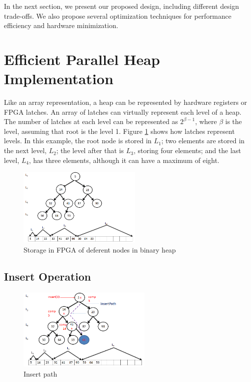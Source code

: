 \documentclass[10pt, conference, compsocconf]{IEEEtran}
\begin{document}
In the next section, we present our proposed design, including different design trade-offs. We also propose several optimization techniques for performance efficiency and hardware minimization.

\section{Efficient Parallel Heap Implementation}
Like an array representation, a heap can be represented by hardware registers or FPGA latches.
An array of latches can virtually represent each level of a heap.
The number of latches at each level can be represented as $2^{\beta-1}$, where $\beta$ is the level, assuming that root is the level 1.
Figure \ref{fig5} shows how latches represent levels.
In this example, the root node is stored in $L_1$; two elements are stored in the next level, $L_2$; the level after that is $L_3$, storing four elements; and the last level, $L_4$, has three elements, although it can have a maximum of eight.

\begin{figure}[!ht]
  \centering
  \includegraphics[width=6cm]{Figures/5.png}
      \caption{Storage in FPGA of deferent nodes in binary heap}
    \label{fig5}
\end{figure}

\subsection{Insert Operation}
\begin{figure}[!ht]
  \centering
  \includegraphics[width=6.5cm]{Figures/6.png}
      \caption{Insert path}
    \label{fig6}
\end{figure}
\end{document}

